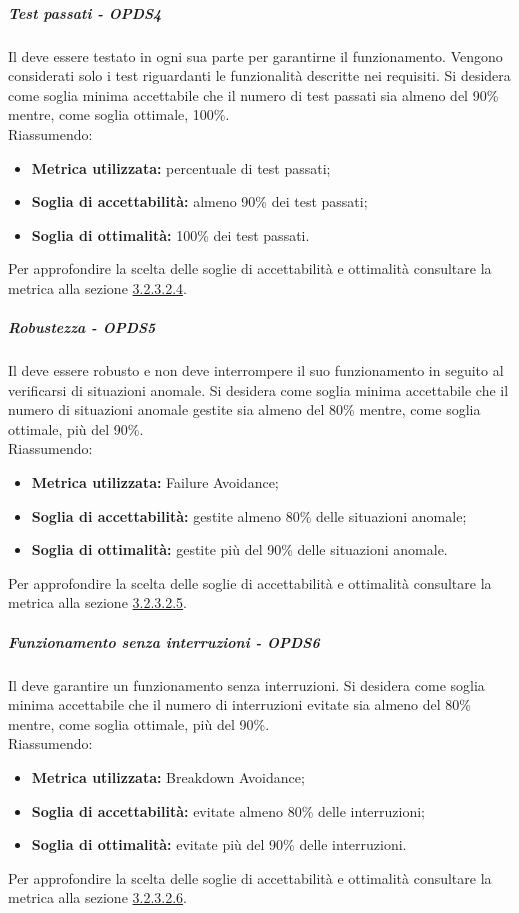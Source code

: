 \documentclass[PianoDiQualifica.tex]{subfiles}
\begin{document}
				\subparagraph{Test passati - OPDS4}
				Il  deve essere testato in ogni sua parte per garantirne il funzionamento. Vengono considerati solo i test riguardanti le funzionalità descritte nei requisiti.
				Si desidera come soglia minima accettabile che il numero di test passati sia almeno del 90\% mentre, come soglia ottimale, 100\%. \\
				Riassumendo:
				\begin{itemize}
				\item \textbf{Metrica utilizzata:} percentuale di test passati;
				\item \textbf{Soglia di accettabilità:} almeno 90\% dei test passati;
				\item \textbf{Soglia di ottimalità:} 100\% dei test passati.
				\end{itemize}
				Per approfondire la scelta delle soglie di accettabilità e ottimalità consultare la metrica alla sezione \hyperlink{test_passati}{3.2.3.2.4}.

				\subparagraph{Robustezza - OPDS5}
				Il  deve essere robusto e non deve interrompere il suo funzionamento in seguito al verificarsi di situazioni anomale.
				Si desidera come soglia minima accettabile che il numero di situazioni anomale gestite sia almeno del 80\% mentre, come soglia ottimale, più del 90\%. \\
				Riassumendo:  
				\begin{itemize}
				\item \textbf{Metrica utilizzata:} Failure Avoidance;
				\item \textbf{Soglia di accettabilità:} gestite almeno 80\% delle situazioni anomale;
				\item \textbf{Soglia di ottimalità:} gestite più del 90\% delle situazioni anomale.
				\end{itemize}
				Per approfondire la scelta delle soglie di accettabilità e ottimalità consultare la metrica alla sezione \hyperlink{failure}{3.2.3.2.5}.

				\subparagraph{Funzionamento senza interruzioni - OPDS6}
				Il  deve garantire un funzionamento senza interruzioni.
				Si desidera come soglia minima accettabile che il numero di interruzioni evitate sia almeno del 80\% mentre, come soglia ottimale, più del 90\%. \\
				Riassumendo:
				\begin{itemize}
				\item \textbf{Metrica utilizzata:} Breakdown Avoidance;
				\item \textbf{Soglia di accettabilità:} evitate almeno 80\% delle interruzioni;
				\item \textbf{Soglia di ottimalità:} evitate più del 90\% delle interruzioni.
				\end{itemize}
				Per approfondire la scelta delle soglie di accettabilità e ottimalità consultare la metrica alla sezione \hyperlink{breakdown}{3.2.3.2.6}.
\end{document}

